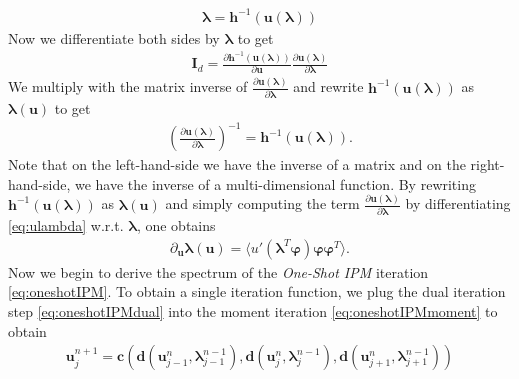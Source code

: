 \documentclass[10pt, a4paper, titlepage, bibliography=totocnumbered]{article}
\newenvironment{proof}[1][Proof]{\begin{trivlist}
\item[\hskip \labelsep {\bfseries #1}]}{\end{trivlist}}
\begin{document}
\begin{proof}
\begin{align}\label{eq:lambdau}
\bm{\lambda} = \bm{h}^{-1}(\bm{u}(\bm{\lambda}))
\end{align}
Now we differentiate both sides by $\bm{\lambda}$ to get
\begin{align*}
\bm{I}_{d} = \frac{\partial \bm{h}^{-1}(\bm{u}(\bm{\lambda}))}{\partial \bm{u}}\frac{\partial \bm{u}(\bm{\lambda})}{\partial \bm{\lambda}}
\end{align*}
We multiply with the matrix inverse of $\frac{\partial \bm{u}(\bm{\lambda})}{\partial \bm{\lambda}}$ and rewrite $\bm{h}^{-1}(\bm{u}(\bm{\lambda}))$ as $\bm{\lambda}(\bm{u})$ to get
\begin{align*}
\left(\frac{\partial \bm{u}(\bm{\lambda})}{\partial \bm{\lambda}}\right)^{-1} = \bm{h}^{-1}(\bm{u}(\bm{\lambda})).
\end{align*}
Note that on the left-hand-side we have the inverse of a matrix and on the right-hand-side, we have the inverse of a multi-dimensional function. By rewriting $\bm{h}^{-1}(\bm{u}(\bm{\lambda}))$ as $\bm{\lambda}(\bm{u})$ and simply computing the term $\frac{\partial \bm{u}(\bm{\lambda})}{\partial \bm{\lambda}}$ by differentiating \eqref{eq:ulambda} w.r.t. $\bm{\lambda}$, one obtains
\begin{align*}
\partial_{\bm{u}} \bm{\lambda}(\bm{u}) = \langle u'(\bm{\lambda}^T\bm{\varphi})\bm{\varphi}\bm{\varphi}^T\rangle.
\end{align*}
Now we begin to derive the spectrum of the \textit{One-Shot IPM} iteration \eqref{eq:oneshotIPM}. To obtain a single iteration function, we plug the dual iteration step \eqref{eq:oneshotIPMdual} into the moment iteration \eqref{eq:oneshotIPMmoment} to obtain
\begin{align*}
\bm{u}_j^{n+1} =  \bm{c}\left(\bm{d}(\bm{u}_{j-1}^{n},\bm{\lambda}_{j-1}^{n-1}),\bm{d}(\bm{u}_{j}^{n},\bm{\lambda}_{j}^{n-1}),\bm{d}(\bm{u}_{j+1}^{n},\bm{\lambda}_{j+1}^{n-1})\right)
\end{align*}
\end{proof}
\end{document}
